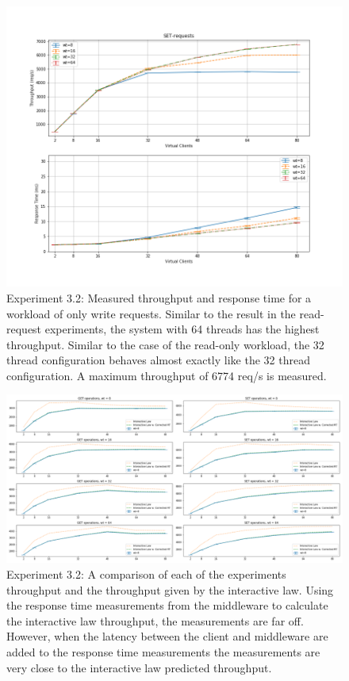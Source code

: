 \documentclass[11pt,a4paper]{article}
\begin{document}
\begin{figure}
\centering
\includegraphics[width=.9\textwidth]{32/32_set_requests}
\caption{Experiment 3.2: Measured throughput and response time for a workload of only write requests. Similar to the result in the read-request experiments, the system with 64 threads has the highest throughput. Similar to the case of the read-only workload, the 32 thread configuration behaves almost exactly like the 32 thread configuration. A maximum throughput of 6774 req/s is measured.}
\label{fig:32_set}
\end{figure}

\begin{figure}[t]
\centering
\includegraphics[width=1\textwidth]{32/32_interactive_law}
\caption{Experiment 3.2: A comparison of each of the experiments throughput and the throughput given by the interactive law. Using the response time measurements from the middleware to calculate the interactive law throughput, the measurements are far off. However, when the latency between the client and middleware are added to the response time measurements the measurements are very close to the interactive law predicted throughput.}
\label{fig:32_interactive_law}
\end{figure}
\end{document}
